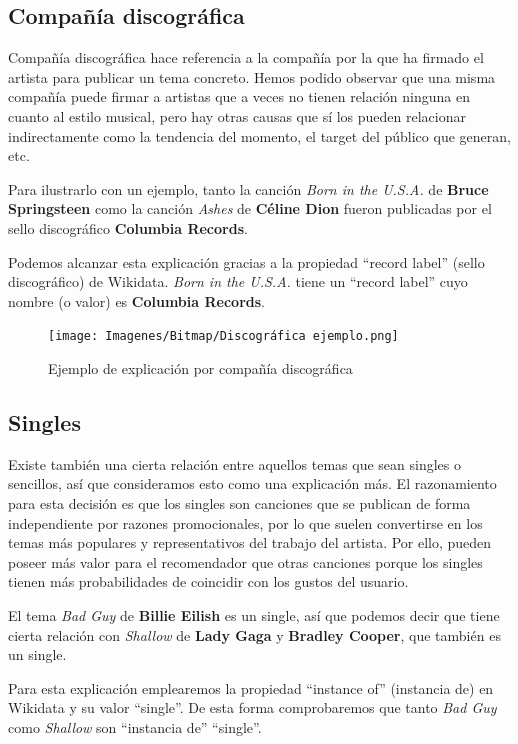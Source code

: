 \subsection*{Compañía discográfica}

Compañía discográfica hace referencia a la compañía por la que ha firmado el artista para publicar un tema concreto. Hemos podido observar que una misma compañía puede firmar a artistas que a veces no tienen relación ninguna en cuanto al estilo musical, pero hay otras causas que sí los pueden relacionar indirectamente como la tendencia del momento, el target del público que generan, etc.

Para ilustrarlo con un ejemplo, tanto la canción \textit{Born in the U.S.A.} de \textbf{Bruce Springsteen} como la canción \textit{Ashes} de \textbf{Céline Dion} fueron publicadas por el sello discográfico \textbf{Columbia Records}.

Podemos alcanzar esta explicación gracias a la propiedad ``record label'' (sello discográfico) de Wikidata. \textit{Born in the U.S.A.} tiene un ``record label'' cuyo nombre (o valor) es \textbf{Columbia Records}.\\

\begin{figure}[h!]
	\centering
	\texttt{[image: Imagenes/Bitmap/Discográfica ejemplo.png]}
	\caption{Ejemplo de explicación por compañía discográfica}
	\label{fig:sampleImage}
\end{figure}

\subsection*{Singles}

Existe también una cierta relación entre aquellos temas que sean singles o sencillos, así que consideramos esto como una explicación más. El razonamiento para esta decisión es que los singles son canciones que se publican de forma independiente por razones promocionales, por lo que suelen convertirse en los temas más populares y representativos del trabajo del artista. Por ello, pueden poseer más valor para el recomendador que otras canciones porque los singles tienen más probabilidades de coincidir con los gustos del usuario.

El tema \textit{Bad Guy} de \textbf{Billie Eilish} es un single, así que podemos decir que tiene cierta relación con \textit{Shallow} de \textbf{Lady Gaga} y \textbf{Bradley Cooper}, que también es un single.

Para esta explicación emplearemos la propiedad ``instance of'' (instancia de) en Wikidata y su valor ``single''. De esta forma comprobaremos que tanto \textit{Bad Guy} como \textit{Shallow} son ``instancia de'' ``single''.\\

